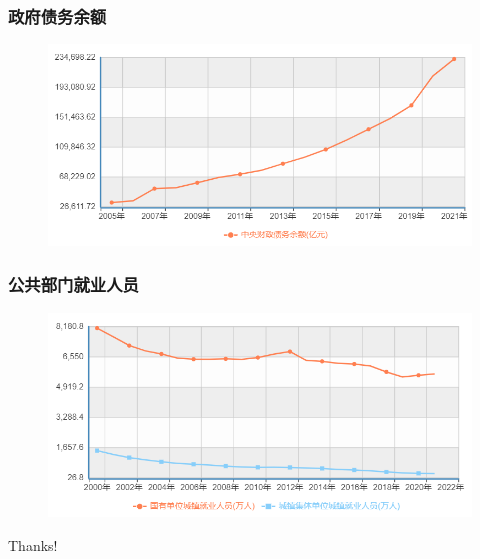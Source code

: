 \documentclass[aspectratio=169, 12pt]{beamer}
\begin{document}
\begin{frame}[plain]
    \frametitle{政府债务余额}
    \begin{figure}
        \centering
        \includegraphics[width=1.0\textwidth]{./resources/figure/debt.png}
    \end{figure}
\end{frame}

\begin{frame}[plain]
    \frametitle{公共部门就业人员}
    \begin{figure}
        \centering
        \includegraphics[width=1.0\textwidth]{./resources/figure/employment.png}
    \end{figure}
\end{frame}

\begin{frame}[standout]
    \begin{center}
        {\Huge\calligra Thanks!}
      \end{center}
\end{frame}
\end{document}
